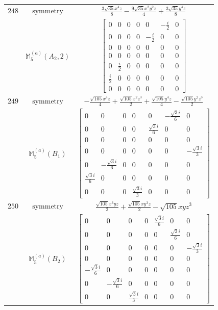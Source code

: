 \documentclass[fleqn,8pt,landscape]{jsarticle}
\begin{document}
\begin{longtable}{ccc}
$ 248 $ & $ \text{symmetry} $ & $ \frac{3 \sqrt{35} x^{4} z}{8} - \frac{9 \sqrt{35} x^{2} y^{2} z}{4} + \frac{3 \sqrt{35} y^{4} z}{8} $ \\
$  $ & $ \mathbb{M}_{5}^{(a)}(A_{2},2) $ & $ \begin{bmatrix} 0 & 0 & 0 & 0 & 0 & - \frac{i}{2} & 0 \\ 0 & 0 & 0 & 0 & - \frac{i}{2} & 0 & 0 \\ 0 & 0 & 0 & 0 & 0 & 0 & 0 \\ 0 & 0 & 0 & 0 & 0 & 0 & 0 \\ 0 & \frac{i}{2} & 0 & 0 & 0 & 0 & 0 \\ \frac{i}{2} & 0 & 0 & 0 & 0 & 0 & 0 \\ 0 & 0 & 0 & 0 & 0 & 0 & 0 \end{bmatrix} $ \\ \hline
$ 249 $ & $ \text{symmetry} $ & $ - \frac{\sqrt{105} x^{4} z}{4} + \frac{\sqrt{105} x^{2} z^{3}}{2} + \frac{\sqrt{105} y^{4} z}{4} - \frac{\sqrt{105} y^{2} z^{3}}{2} $ \\
$  $ & $ \mathbb{M}_{5}^{(a)}(B_{1}) $ & $ \begin{bmatrix} 0 & 0 & 0 & 0 & 0 & - \frac{\sqrt{3} i}{6} & 0 \\ 0 & 0 & 0 & 0 & \frac{\sqrt{3} i}{6} & 0 & 0 \\ 0 & 0 & 0 & 0 & 0 & 0 & 0 \\ 0 & 0 & 0 & 0 & 0 & 0 & - \frac{\sqrt{3} i}{3} \\ 0 & - \frac{\sqrt{3} i}{6} & 0 & 0 & 0 & 0 & 0 \\ \frac{\sqrt{3} i}{6} & 0 & 0 & 0 & 0 & 0 & 0 \\ 0 & 0 & 0 & \frac{\sqrt{3} i}{3} & 0 & 0 & 0 \end{bmatrix} $ \\ \hline
$ 250 $ & $ \text{symmetry} $ & $ \frac{\sqrt{105} x^{3} y z}{2} + \frac{\sqrt{105} x y^{3} z}{2} - \sqrt{105} x y z^{3} $ \\
$  $ & $ \mathbb{M}_{5}^{(a)}(B_{2}) $ & $ \begin{bmatrix} 0 & 0 & 0 & 0 & \frac{\sqrt{3} i}{6} & 0 & 0 \\ 0 & 0 & 0 & 0 & 0 & \frac{\sqrt{3} i}{6} & 0 \\ 0 & 0 & 0 & 0 & 0 & 0 & - \frac{\sqrt{3} i}{3} \\ 0 & 0 & 0 & 0 & 0 & 0 & 0 \\ - \frac{\sqrt{3} i}{6} & 0 & 0 & 0 & 0 & 0 & 0 \\ 0 & - \frac{\sqrt{3} i}{6} & 0 & 0 & 0 & 0 & 0 \\ 0 & 0 & \frac{\sqrt{3} i}{3} & 0 & 0 & 0 & 0 \end{bmatrix} $ \\ \hline

\end{longtable}
\end{document}
